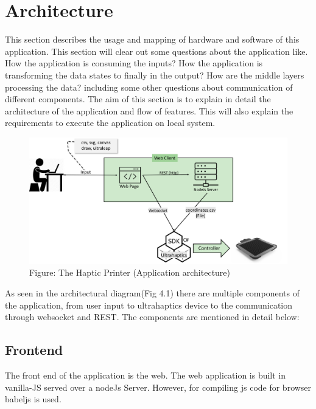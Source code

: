 %
\chapter{Architecture}
\label{sec:architecture}


This section describes the usage and mapping of hardware and software of this application. This section 
will clear out some questions about the application like. How the application
is consuming the inputs? How the application is transforming the data states to finally in the output? 
How are the middle layers processing the data? including some other questions about communication of different components.
The aim of this section is to explain in detail the architecture of the application and flow of features. This will also 
explain the requirements to execute the application on local system.

\begin{figure}[htb]
	\includegraphics[width=\textwidth]{gfx/Ultrahaptics-custom-architecture}
	\caption{Figure: The Haptic Printer (Application architecture)}
	\label{fig:architecture:overall architecture}
\end{figure}


As seen in the architectural diagram(Fig 4.1) there are multiple components of
 the application, from user 
input to ultrahaptics device to the communication through websocket and REST. 
The components are mentioned in detail below:\\

\section{Frontend}
The front end of the application is the web. The web application is built in 
vanilla-JS served over a nodeJs Server. However, for compiling 
js code for browser babeljs\cite{babel7.15} is used.

